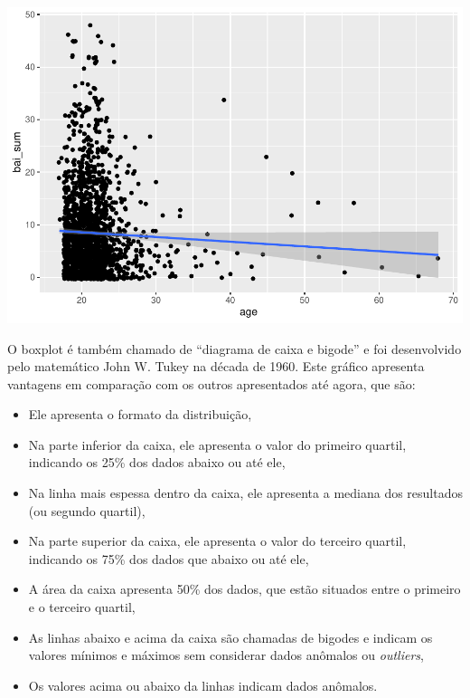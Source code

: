 \documentclass[
]{book}
\providecommand{\tightlist}{%
  \setlength{\itemsep}{0pt}\setlength{\parskip}{0pt}}
\begin{document}
\begin{center}\includegraphics{gitbook-demo_files/figure-latex/unnamed-chunk-24-1} \end{center}

O boxplot é também chamado de ``diagrama de caixa e bigode'' e foi
desenvolvido pelo matemático John W. Tukey na década de 1960. Este
gráfico apresenta vantagens em comparação com os outros apresentados até
agora, que são:

\begin{itemize}
\tightlist
\item
  Ele apresenta o formato da distribuição,\\
\item
  Na parte inferior da caixa, ele apresenta o valor do primeiro quartil,
  indicando os 25\% dos dados abaixo ou até ele,\\
\item
  Na linha mais espessa dentro da caixa, ele apresenta a mediana dos
  resultados (ou segundo quartil),\\
\item
  Na parte superior da caixa, ele apresenta o valor do terceiro quartil,
  indicando os 75\% dos dados que abaixo ou até ele,\\
\item
  A área da caixa apresenta 50\% dos dados, que estão situados entre o
  primeiro e o terceiro quartil,\\
\item
  As linhas abaixo e acima da caixa são chamadas de bigodes e indicam os
  valores mínimos e máximos sem considerar dados anômalos ou
  \emph{outliers},\\
\item
  Os valores acima ou abaixo da linhas indicam dados anômalos.
\end{itemize}
\end{document}

